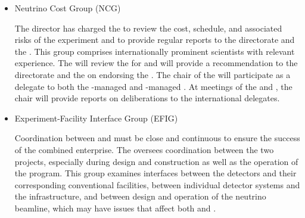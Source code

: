 \begin{itemize}
\item Neutrino Cost Group (NCG)

The  director has charged the  to review the cost, schedule, and associated risks of the  experiment and to provide regular reports to the  directorate and the . This group comprises internationally prominent scientists with relevant experience. 
The   will review the   for  and will provide a recommendation to the  directorate and the  on endorsing the  . The chair of the   will participate as a delegate to both the -managed  and -managed . At meetings of the  and , the  chair will provide reports on   deliberations to the international delegates.



\item Experiment-Facility Interface Group (EFIG)

Coordination between  and  must be close and continuous to ensure the success of the combined enterprise. The   oversees coordination between the two projects, especially during design and construction as well as the operation of the program.   
This group examines interfaces between the detectors and their corresponding conventional facilities, between individual detector systems and the  infrastructure, and between design and operation of the  neutrino beamline,  which may have issues that affect both  and .  

\end{itemize}

